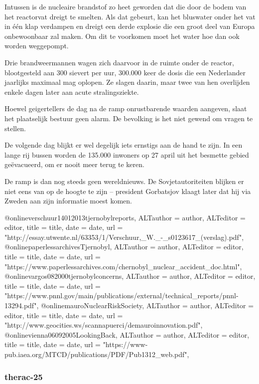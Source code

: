 {Intussen is de nucleaire brandstof zo heet geworden dat die door de bodem van het reactorvat dreigt te smelten. Als dat gebeurt, kan het bluswater onder het vat in één klap verdampen en dreigt een derde explosie die een groot deel van Europa onbewoonbaar zal maken. Om dit te voorkomen moet het water hoe dan ook worden weggepompt.

Drie brandweermannen wagen zich daarvoor in de ruimte onder de reactor, blootgesteld aan 300 sievert per uur, 300.000 keer de dosis die een Nederlander jaarlijks maximaal mag oplopen. Ze slagen daarin, maar twee van hen overlijden enkele dagen later aan acute stralingsziekte.

Hoewel geigertellers de dag na de ramp onrustbarende waarden aangeven, slaat het plaatselijk bestuur geen alarm. De bevolking is het niet gewend om vragen te stellen.

De volgende dag blijkt er wel degelijk iets ernstigs aan de hand te zijn. In een lange rij bussen worden de 135.000 inwoners op 27 april uit het besmette gebied geëvacueerd, om er nooit meer terug te keren.

De ramp is dan nog steeds geen wereldnieuws. De Sovjetautoriteiten blijken er niet eens van op de hoogte te zijn – president Gorbatsjov klaagt later dat hij via Zweden aan zijn informatie moest komen.


@online{verschuur14012013tjernobylreports,	ALTauthor = {author},	ALTeditor = {editor},	title = {title},	date = {date},	url = {"http://essay.utwente.nl/63353/1/Verschuur,_W._-_s0123617_(verslag).pdf"},}
\cite{}
@online{paperlessarchivesTjernobyl,	ALTauthor = {author},	ALTeditor = {editor},	title = {title},	date = {date},	url = {"https://www.paperlessarchives.com/chernobyl_nuclear_accident_doc.html"},}
\cite{}
@online{vargos082000tjernobylconcerns,	ALTauthor = {author},	ALTeditor = {editor},	title = {title},	date = {date},	url = {"https://www.pnnl.gov/main/publications/external/technical_reports/pnnl-13294.pdf"},}
\cite{}
@online{mauroNuclearRiskSociety,	ALTauthor = {author},	ALTeditor = {editor},	title = {title},	date = {date},	url = {"http://www.geocities.ws/scannapuerci/demauroinnovation.pdf"},}
\cite{}
@online{vienna06092005LookingBack,	ALTauthor = {author},	ALTeditor = {editor},	title = {title},	date = {date},	url = {"https://www-pub.iaea.org/MTCD/publications/PDF/Pub1312_web.pdf"},}
\cite{}

\subsubsection{therac-25}

}
